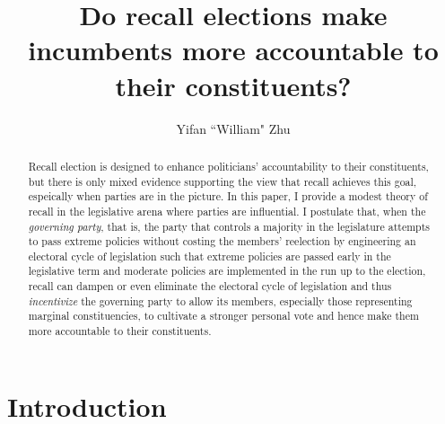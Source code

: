 \documentclass{article}
\title{Do recall elections make incumbents more accountable to their constituents?}
\author{Yifan ``William" Zhu}
\begin{document}
	\maketitle
	\begin{abstract}
		Recall election is designed to enhance politicians' accountability to their constituents,
		but there is only mixed evidence supporting the view that recall achieves this goal,
		espeically when parties are in the picture.
		In this paper,
		I provide a modest theory of recall
		in the legislative arena where parties are influential.
		I postulate that,
		when the \textit{governing party},
		that is, the party that controls a majority
		in the legislature
		attempts to pass extreme policies without costing the members' reelection
		by engineering an electoral cycle of legislation
		such that extreme policies are passed early in the legislative term
		and moderate policies are implemented in the run up to the election,
		recall
		can dampen or even eliminate the electoral cycle of legislation
		and thus \textit{incentivize} the governing party
		to allow its members,
		especially those representing marginal constituencies,
		to cultivate a stronger personal vote
		and hence make them more accountable to their constituents.
	\end{abstract}
	
	
	
	
	
	\section*{Introduction}
	
\end{document}
